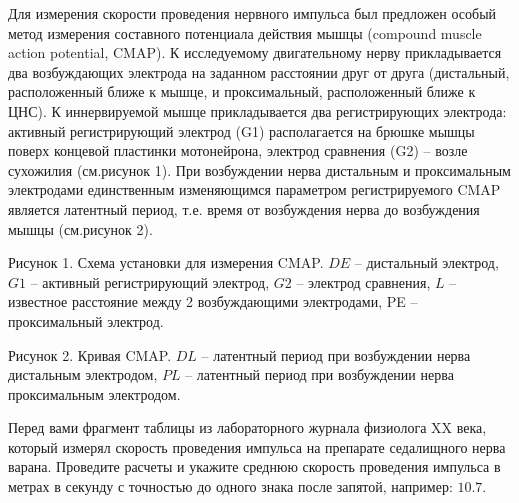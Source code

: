
Для
измерения скорости проведения нервного импульса был предложен особый метод
измерения составного потенциала действия мышцы (compound muscle action
potential, CMAP). К исследуемому
двигательному нерву прикладывается два возбуждающих электрода на заданном
расстоянии друг от друга (дистальный,
расположенный ближе к мышце, и проксимальный,
расположенный ближе к ЦНС). К иннервируемой мышце прикладывается два
регистрирующих электрода: активный
регистрирующий электрод (G1) располагается на брюшке мышцы поверх концевой
пластинки мотонейрона, электрод
сравнения (G2) – возле сухожилия (см.рисунок 1). При возбуждении нерва
дистальным и проксимальным электродами единственным изменяющимся параметром
регистрируемого CMAP является латентный период, т.е. время от возбуждения нерва
до возбуждения мышцы (см.рисунок 2).


Рисунок
1. Схема установки для измерения CMAP. $DE$ – дистальный электрод, $G1$ – активный
регистрирующий электрод, $G2$ – электрод сравнения, $L$ – известное расстояние
между 2 возбуждающими электродами, PE – проксимальный электрод.


Рисунок
2. Кривая CMAP. $DL$  – латентный период при возбуждении нерва дистальным электродом,
$PL$  – латентный период при возбуждении нерва проксимальным электродом.

Перед вами фрагмент таблицы из лабораторного
журнала физиолога XX века, который измерял скорость проведения импульса на
препарате седалищного нерва варана. Проведите расчеты и укажите среднюю
скорость проведения импульса в метрах в секунду с точностью до одного знака
после запятой, например: $10.7$.  


